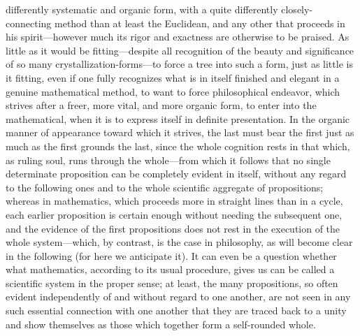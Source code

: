 \documentclass[12pt,a4paper]{book}
\begin{document}
differently systematic and organic form, with a quite differently
closely-connecting method than at least the Euclidean, and any other that proceeds
in his spirit---however much its rigor and exactness are otherwise to be praised.
As little as it would be fitting---despite all recognition of the beauty and
significance of so many crystallization-forms---to force a tree into such a form,
just as little is it fitting, even if one fully recognizes what is in itself
finished and elegant in a genuine mathematical method, to want to force
philosophical endeavor, which strives after a freer, more vital, and more organic
form, to enter into the mathematical, when it is to express itself in definite
presentation. In the organic manner of appearance toward which it strives, the
last must bear the first just as much as the first grounds the last, since the
whole cognition rests in that which, as ruling soul, runs through the
whole---from which it follows that no single determinate proposition can be
completely evident in itself, without any regard to the following ones and to the
whole scientific aggregate of propositions; whereas in mathematics, which proceeds
more in straight lines than in a cycle, each earlier proposition is certain enough
without needing the subsequent one, and the evidence of the first propositions
does not rest in the execution of the whole system---which, by contrast, is the
case in philosophy, as will become clear in the following (for here we anticipate
it). It can even be a question whether what mathematics, according to its usual
procedure, gives us can be called a scientific system in the proper sense; at
least, the many propositions, so often evident independently of and without regard
to one another, are not seen in any such essential connection with one another
that they are traced back to a unity and show themselves as those which together
form a self-rounded whole.
\end{document}
